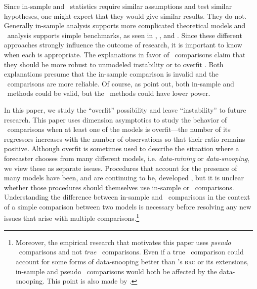 \documentclass[11pt]{article}
\newcommand{\citepos}[1]{\citeauthor{#1}'s \citeyearpar{#1}}
\begin{document}
Since in-sample and \oos\ statistics require similar assumptions and
test similar hypotheses, one might expect that they would give similar
results.  They do not.  Generally in-sample analysis supports more
complicated theoretical models and \oos\ analysis supports simple
benchmarks, as seen in \citet{MeR:83}, \citet{StW:03}, and
\citet{GoW:08}.  Since these different approaches strongly influence
the outcome of research, it is important to know when each is
appropriate.  The explanations in favor of \oos\ comparisons claim
that they should be more robust to unmodeled instability
\citep{ClM:05,GiW:06,GiR:09,GiR:10} or to overfit
\citep{Mcc:98,Cla:04}.  Both explanations presume that the in-sample
comparison is invalid and the \oos\ comparisons are more reliable.  Of
course, as \citet{InK:04,InK:06} point out, both in-sample and \oos\
methods could be valid, but the \oos\ methods could have lower power.

In this paper, we study the ``overfit'' possibility and leave
``instability'' to future research. This paper uses dimension
asymptotics to study the behavior of \oos\ comparisons when at least
one of the models is overfit---the number of its regressors
increases with the number of observations so that their ratio remains
positive.  Although overfit is sometimes used to describe the
situation where a forecaster chooses from many different models,
i.e. \textit{data-mining} or \textit{data-snooping}, we view these as
separate issues.  Procedures that account for the presence of many
models have been, and are continuing to be, developed \citep[see, for
example,][]{Whi:00,Han:05,RoW:05,HHK:10,ClM:12b}, but it is unclear
whether those procedures should themselves use in-sample or \oos\
comparisons.  Understanding the difference between in-sample and \oos\
comparisons in the context of a simple comparison between two models
is necessary before resolving any new issues that arise with multiple
comparisons.\footnote{Moreover, the empirical research that motivates
  this paper uses \textit{pseudo} \oos\ comparisons and not
  \textit{true} \oos\ comparisons.  Even if a true \oos\ comparison
  could account for some forms of data-snooping better than
  \citepos{Whi:00} \textsc{brc} or its extensions, in-sample and
  pseudo \oos\ comparisons would both be affected by the data-snooping.
  This point is also made by \citet{InK:04}.}
\end{document}
